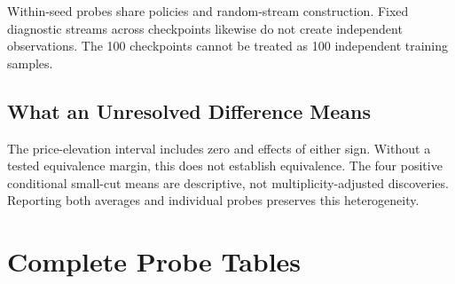 \documentclass{article}
\begin{document}
Within-seed probes share policies and random-stream construction. Fixed diagnostic streams across checkpoints likewise do not create independent observations. The 100 checkpoints cannot be treated as 100 independent training samples.

\subsection{What an Unresolved Difference Means}

The price-elevation interval includes zero and effects of either sign. Without a tested equivalence margin, this does not establish equivalence. The four positive conditional small-cut means are descriptive, not multiplicity-adjusted discoveries. Reporting both averages and individual probes preserves this heterogeneity.

\section{Complete Probe Tables}

\newcommand{\probetable}[4]{%
\begin{longtable}{@{}cccSSSSr@{}}
\caption{#1 \label{#2}} \\
\toprule
Seed & Firm & $t$ & {Immediate} & {$G$} & {Lower 95\%} & {Upper 95\%} & {Area} \\
\midrule
\endfirsthead
\multicolumn{8}{c}{\tablename\ \thetable{} -- continued} \\
\toprule
Seed & Firm & $t$ & {Immediate} & {$G$} & {Lower 95\%} & {Upper 95\%} & {Area} \\
\midrule
\endhead
\bottomrule
\endfoot
#3
\end{longtable}
\vspace{-1em}
\footnotesize{#4}
}

\end{document}
